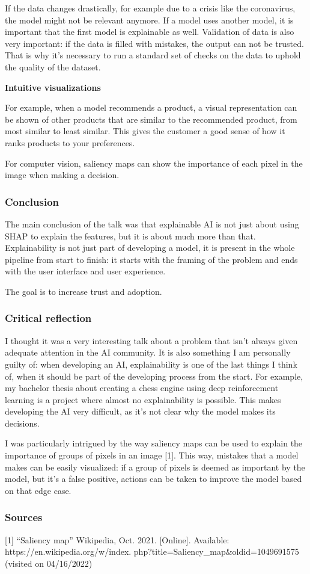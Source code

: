 \documentclass{article}
\begin{document}
If the data changes drastically, for example due to a crisis like the coronavirus, the model might not be relevant anymore.
If a model uses another model, it is important that the first model is explainable as well. 
Validation of data is also very important: if the data is filled with mistakes, 
the output can not be trusted. That is why it's necessary to run a standard set of checks
on the data to uphold the quality of the dataset.

\textbf{Intuitive visualizations}

For example, when a model recommends a product, a visual representation can be shown of 
other products that are similar to the recommended product, from most similar to least similar.
This gives the customer a good sense of how it ranks products to your preferences.

For computer vision, saliency maps can show the importance of each pixel in the image when 
making a decision.

\subsubsection{Conclusion}

The main conclusion of the talk was that explainable AI is not just about using SHAP to explain
the features, but it is about much more than that.
Explainability is not just part of developing a model, 
it is present in the whole pipeline from start to finish: it starts with the framing of the problem
and ends with the user interface and user experience.

The goal is to increase trust and adoption.

\subsubsection{Critical reflection}

I thought it was a very interesting talk about a problem that isn't always given adequate 
attention in the AI community. It is also something I am personally guilty of: when developing
an AI, explainability is one of the last things I think of, when it should be part of the 
developing process from the start. For example, my bachelor thesis about creating a chess engine using deep reinforcement learning
is a project where almost no explainability is possible. This makes developing the AI 
very difficult, as it's not clear why the model makes its decisions. 

I was particularly intrigued by the way saliency maps can be used to explain the importance
of groups of pixels in an image [1]. This way, mistakes that a model makes can be easily visualized:
if a group of pixels is deemed as important by the model, but it's a false positive, actions can 
be taken to improve the model based on that edge case.


\subsubsection{Sources}

[1] ``Saliency map'' Wikipedia, Oct. 2021. [Online]. Available: https://en.wikipedia.org/w/index.
php?title=Saliency\_map\&oldid=1049691575 (visited on 04/16/2022)
\end{document}
